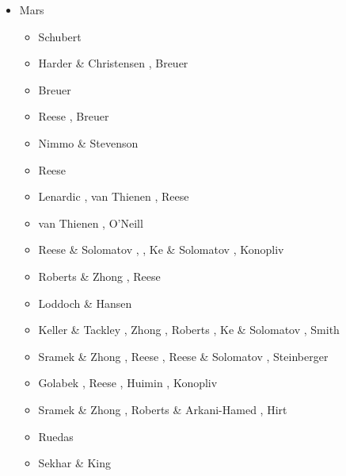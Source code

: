 \begin{itemize}
\item Mars \\
\begin{scriptsize}
\begin{itemize}
\item[\nineteenninety] Schubert \etal \cite{scbg90}
\item[\nineteenninetysix] Harder \& Christensen \cite{hach96}, Breuer \etal \cite{brzy96}
\item[\nineteenninetyseven] Breuer \etal \cite{brys97}
\item[\nineteenninetyeight] Reese \etal \cite{resm98}, Breuer \etal \cite{brys98}
\item[\twothousandone] Nimmo \& Stevenson \cite{nist01}
\item[\twothousandtwo] Reese \etal \cite{resb02}
\item[\twothousandfour] Lenardic \etal \cite{lenm04}, van Thienen \etal \cite{vavv04c}, 
                        Reese \etal \cite{resb04}
\item[\twothousandfive] van Thienen \etal \cite{vavv05}, O'Neill \etal \cite{onml05}
\item[\twothousandsix] Reese \& Solomatov \cite{reso06}, \cite{losh06,rozh06}, 
                       Ke \& Solomatov \cite{keso06}, Konopliv \etal \cite{koys06}
\item[\twothousandseven] Roberts \& Zhong \cite{rozh07}, Reese \etal \cite{reso07b}
\item[\twothousandeight] Loddoch \& Hansen \cite{loha08}
\item[\twothousandnine] Keller \& Tackley \cite{keta09}, Zhong \cite{zhon09}, 
                        Roberts \etal \cite{rolm09}, Ke \& Solomatov \cite{keso09},
                        Smith \etal \cite{smzt09}
\item[\twothousandten] Sramek \& Zhong \cite{srzh10}, Reese \etal \cite{reos10}, 
                       Reese \& Solomatov \cite{reso10}, Steinberger \etal \cite{stwt10}
\item[\twothousandeleven] Golabek \etal \cite{gokg11}, Reese \etal \cite{reos11}, 
                          Huimin \etal \cite{jizl11}, Konopliv \etal \cite{koaf11}
\item[\twothousandtwelve] Sramek \& Zhong \cite{srzh12}, Roberts \& Arkani-Hamed \cite{roar12}, 
                          Hirt \etal \cite{hick12}
\item[\twothousandthirteen] Ruedas \etal \cite{ruts13}
\item[\twothousandfourteen] Sekhar \& King \cite{seki14}

\end{itemize}
\end{scriptsize}
\end{itemize}
